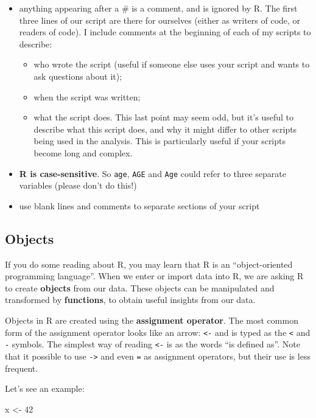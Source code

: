 \documentclass[
]{memoir}
\newenvironment{Shaded}{\begin{snugshade}}{\end{snugshade}}
\newcommand{\DecValTok}[1]{\textcolor[rgb]{0.00,0.00,0.81}{#1}}
\newcommand{\NormalTok}[1]{#1}
\newcommand{\OtherTok}[1]{\textcolor[rgb]{0.56,0.35,0.01}{#1}}
\begin{document}
\begin{itemize}
\item
  anything appearing after a \# is a comment, and is ignored by R. The first three lines of our script are there for ourselves (either as writers of code, or readers of code). I include comments at the beginning of each of my scripts to describe:

  \begin{itemize}
  \item
    who wrote the script (useful if someone else uses your script and wants to ask questions about it);
  \item
    when the script was written;
  \item
    what the script does. This last point may seem odd, but it's useful to describe what this script does, and why it might differ to other scripts being used in the analysis. This is particularly useful if your scripts become long and complex.
  \end{itemize}
\item
  \textbf{R is case-sensitive}. So \texttt{age}, \texttt{AGE} and \texttt{Age} could refer to three separate variables (please don't do this!)
\item
  use blank lines and comments to separate sections of your script
\end{itemize}

\hypertarget{objects}{%
\subsection{Objects}\label{objects}}

If you do some reading about R, you may learn that R is an ``object-oriented programming language''. When we enter or import data into R, we are asking R to create \textbf{objects} from our data. These objects can be manipulated and transformed by \textbf{functions}, to obtain useful insights from our data.

Objects in R are created using the \textbf{assignment operator}. The most common form of the assignment operator looks like an arrow: \texttt{\textless{}-} and is typed as the \texttt{\textless{}} and \texttt{-} symbols. The simplest way of reading \texttt{\textless{}-} is as the words ``is defined as''. Note that it possible to use \texttt{-\textgreater{}} and even \texttt{=} as assignment operators, but their use is less frequent.

Let's see an example:

\begin{Shaded}
\begin{Highlighting}[]
\NormalTok{x }\OtherTok{\textless{}{-}} \DecValTok{42}
\end{Highlighting}
\end{Shaded}
\end{document}
